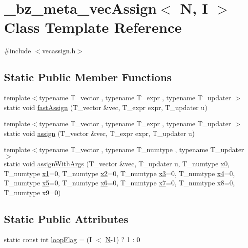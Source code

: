 \hypertarget{class__bz__meta__vecAssign}{}\section{\+\_\+bz\+\_\+meta\+\_\+vec\+Assign$<$ N, I $>$ Class Template Reference}
\label{class__bz__meta__vecAssign}


{\ttfamily \#include $<$vecassign.\+h$>$}

\subsection*{Static Public Member Functions}
\begin{DoxyCompactItemize}
\item 
{\footnotesize template$<$typename T\+\_\+vector , typename T\+\_\+expr , typename T\+\_\+updater $>$ }\\static void \hyperlink{class__bz__meta__vecAssign_a9caaa6657856e8b8b7afa1c381683067}{fast\+Assign} (T\+\_\+vector \&vec, T\+\_\+expr expr, T\+\_\+updater u)
\item 
{\footnotesize template$<$typename T\+\_\+vector , typename T\+\_\+expr , typename T\+\_\+updater $>$ }\\static void \hyperlink{class__bz__meta__vecAssign_a07095f27536aaa02f0808c333768dabe}{assign} (T\+\_\+vector \&vec, T\+\_\+expr expr, T\+\_\+updater u)
\item 
{\footnotesize template$<$typename T\+\_\+vector , typename T\+\_\+numtype , typename T\+\_\+updater $>$ }\\static void \hyperlink{class__bz__meta__vecAssign_a6d5dfa1b871d1570a1d3f51f3b0276ca}{assign\+With\+Args} (T\+\_\+vector \&vec, T\+\_\+updater u, T\+\_\+numtype \hyperlink{gendata_8m_aa48da42c617fdb7cf84e9a3f80aa04e8}{x0}, T\+\_\+numtype \hyperlink{gendata_8m_ac39b33361203e68d7820336db48d45e6}{x1}=0, T\+\_\+numtype \hyperlink{gendata_8m_aab2463cd078f7c5368f6eb80f5a549b8}{x2}=0, T\+\_\+numtype \hyperlink{gendata_8m_a03ad2628eb1c540113251638112541e3}{x3}=0, T\+\_\+numtype \hyperlink{gendata_8m_a6bda50c9c4fcd62d903ac36326be97fa}{x4}=0, T\+\_\+numtype \hyperlink{gendata_8m_ada1c75f0b02ca3e175d740e56846ebe2}{x5}=0, T\+\_\+numtype \hyperlink{gendata_8m_ad6d3d5dc708b3e9ca4465d0d189b0514}{x6}=0, T\+\_\+numtype \hyperlink{gendata_8m_a0d4a0f2f58d6d7ae22259e658c4bbe5d}{x7}=0, T\+\_\+numtype x8=0, T\+\_\+numtype x9=0)
\end{DoxyCompactItemize}
\subsection*{Static Public Attributes}
\begin{DoxyCompactItemize}
\item 
static const int \hyperlink{class__bz__meta__vecAssign_ade79bd12e82e4cca649309d26b722a74}{loop\+Flag} = (I $<$ \hyperlink{polmisc_8c_a0240ac851181b84ac374872dc5434ee4}{N}-\/1) ? 1 \+: 0
\end{DoxyCompactItemize}


